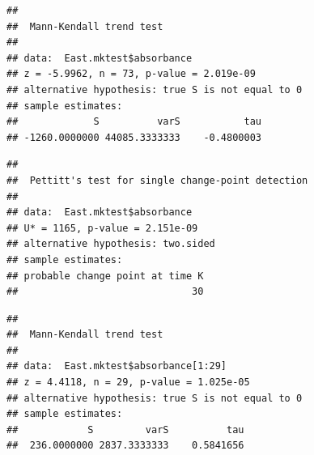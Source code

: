 \documentclass[12pt,]{article}
\newenvironment{Shaded}{\begin{snugshade}}{\end{snugshade}}
\newcommand{\KeywordTok}[1]{\textcolor[rgb]{0.13,0.29,0.53}{\textbf{#1}}}
\newcommand{\DecValTok}[1]{\textcolor[rgb]{0.00,0.00,0.81}{#1}}
\newcommand{\CommentTok}[1]{\textcolor[rgb]{0.56,0.35,0.01}{\textit{#1}}}
\newcommand{\OperatorTok}[1]{\textcolor[rgb]{0.81,0.36,0.00}{\textbf{#1}}}
\newcommand{\NormalTok}[1]{#1}
\begin{document}
\begin{verbatim}
## 
##  Mann-Kendall trend test
## 
## data:  East.mktest$absorbance
## z = -5.9962, n = 73, p-value = 2.019e-09
## alternative hypothesis: true S is not equal to 0
## sample estimates:
##             S          varS           tau 
## -1260.0000000 44085.3333333    -0.4800003
\end{verbatim}

\begin{Shaded}
\end{Shaded}

\begin{verbatim}
## 
##  Pettitt's test for single change-point detection
## 
## data:  East.mktest$absorbance
## U* = 1165, p-value = 2.151e-09
## alternative hypothesis: two.sided
## sample estimates:
## probable change point at time K 
##                              30
\end{verbatim}

\begin{Shaded}
\end{Shaded}

\begin{verbatim}
## 
##  Mann-Kendall trend test
## 
## data:  East.mktest$absorbance[1:29]
## z = 4.4118, n = 29, p-value = 1.025e-05
## alternative hypothesis: true S is not equal to 0
## sample estimates:
##            S         varS          tau 
##  236.0000000 2837.3333333    0.5841656
\end{verbatim}

\begin{Shaded}
\end{Shaded}
\end{document}
